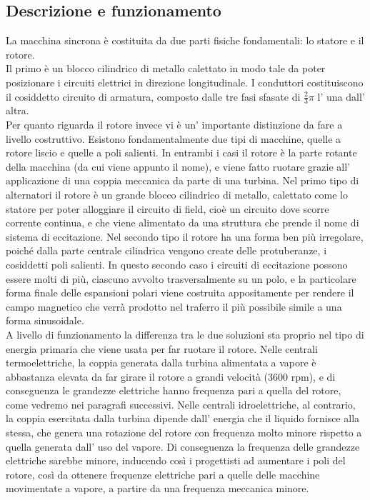 \documentclass[Lau,noexaminfo]{sapthesis}
\begin{document}
	\subsection{Descrizione e funzionamento}
	La macchina sincrona è costituita da due parti fisiche fondamentali: lo statore e il rotore.\\
	Il primo è un blocco cilindrico di metallo calettato in modo tale da poter posizionare i circuiti elettrici in direzione longitudinale. I conduttori costituiscono il cosiddetto circuito di armatura, composto dalle tre fasi sfasate di $\frac{2}{3}\pi$ l' una dall' altra.\\
	Per quanto riguarda il rotore invece vi è un' importante distinzione da fare a livello costruttivo. Esistono fondamentalmente due tipi di macchine, quelle a rotore liscio e quelle a poli salienti. In entrambi i casi il rotore è la parte rotante della macchina (da cui viene appunto il nome), e viene fatto ruotare grazie all' applicazione di una coppia meccanica da parte di una turbina. Nel primo tipo di alternatori il rotore è un grande blocco cilindrico di metallo, calettato come lo statore per poter alloggiare il circuito di field, cioè un circuito dove scorre corrente continua, e che viene alimentato da una struttura che prende il nome di sistema di eccitazione. Nel secondo tipo il rotore ha una forma ben più irregolare, poiché dalla parte centrale cilindrica vengono create delle protuberanze, i cosiddetti poli salienti. In questo secondo caso i circuiti di eccitazione possono essere molti di più, ciascuno avvolto trasversalmente su un polo, e la particolare forma finale delle espansioni polari viene costruita appositamente per rendere il campo magnetico che verrà prodotto nel traferro il più possibile simile a una forma sinusoidale.\\
	A livello di funzionamento la differenza tra le due soluzioni sta proprio nel tipo di energia primaria che viene usata per far ruotare il rotore. Nelle centrali termoelettriche, la coppia generata dalla turbina alimentata a vapore è abbastanza elevata da far girare il rotore a grandi velocità (3600 rpm), e di conseguenza le grandezze elettriche hanno frequenza pari a quella del rotore, come vedremo nei paragrafi successivi. Nelle centrali idroelettriche, al contrario, la coppia esercitata dalla turbina dipende dall' energia che il liquido fornisce alla stessa, che genera una rotazione del rotore con frequenza molto minore rispetto a quella generata dall' uso del vapore. Di conseguenza la frequenza delle grandezze elettriche sarebbe minore, inducendo così i progettisti ad aumentare i poli del rotore, così da ottenere frequenze elettriche pari a quelle delle macchine movimentate a vapore, a partire da una frequenza meccanica minore.
\end{document}
